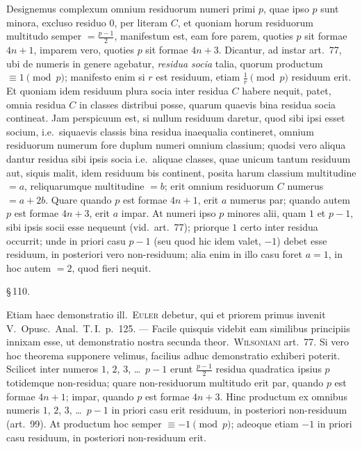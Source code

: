 \documentclass[12pt,a4paper]{article}
\theoremstyle{plain}
\theoremstyle{definition}
\theoremstyle{remark}
\begin{document}
Designemus complexum omnium residuorum numeri primi $p$, quae ipso $p$ sunt minora, excluso residuo $0$, per literam $C$, et quoniam horum residuorum multitudo semper $= \frac{p-1}{2}$, manifestum est, eam fore parem, quoties $p$ sit formae $4n+1$, imparem vero, quoties $p$ sit formae $4n+3$. Dicantur, ad instar art.~77, ubi de numeris in genere agebatur, \emph{residua socia} talia, quorum productum $\equiv 1 \pmod{p}$; manifesto enim si $r$ est residuum, etiam $\frac{1}{r} \pmod{p}$ residuum erit. Et quoniam idem residuum plura socia inter residua $C$ habere nequit, patet, omnia residua $C$ in classes distribui posse, quarum quaevis bina residua socia contineat. Jam perspicuum est, si nullum residuum daretur, quod sibi ipsi esset socium, i.e.\ siquaevis classis bina residua inaequalia contineret, omnium residuorum numerum fore duplum numeri omnium classium; quodsi vero aliqua dantur residua sibi ipsis socia i.e.\ aliquae classes, quae unicum tantum residuum aut, siquis malit, idem residuum bis continent, posita harum classium multitudine $= a$, reliquarumque multitudine $= b$; erit omnium residuorum $C$ numerus $= a + 2b$. Quare quando $p$ est formae $4n+1$, erit $a$ numerus par; quando autem $p$ est formae $4n+3$, erit $a$ impar. At numeri ipso $p$ minores alii, quam $1$ et $p-1$, sibi ipsis socii esse nequeunt (vid.\ art.~77); priorque $1$ certo inter residua occurrit; unde in priori casu $p-1$ (seu quod hic idem valet, $-1$) debet esse residuum, in posteriori vero non-residuum; alia enim in illo casu foret $a = 1$, in hoc autem $= 2$, quod fieri nequit.

\begin{center}\S\,110.\end{center}

Etiam haec demonstratio ill.\ \textsc{Euler} debetur, qui et priorem primus invenit V.\ Opusc.\ Anal.\ T.\,I.\ p.~125. --- Facile quisquis videbit eam similibus principiis innixam esse, ut demonstratio nostra secunda theor.\ \textsc{Wilsoniani} art.~77. Si vero hoc theorema supponere velimus, facilius adhuc demonstratio exhiberi poterit. Scilicet inter numeros $1$, $2$, $3$, \dots\ $p-1$ erunt $\frac{p-1}{2}$ residua quadratica ipsius $p$ totidemque non-residua; quare non-residuorum multitudo erit par, quando $p$ est formae $4n+1$; impar, quando $p$ est formae $4n+3$. Hinc productum ex omnibus numeris $1$, $2$, $3$, \dots\ $p-1$ in priori casu erit residuum, in posteriori non-residuum (art.~99). At productum hoc semper $\equiv -1 \pmod{p}$; adeoque etiam $-1$ in priori casu residuum, in posteriori non-residuum erit.
\end{document}
